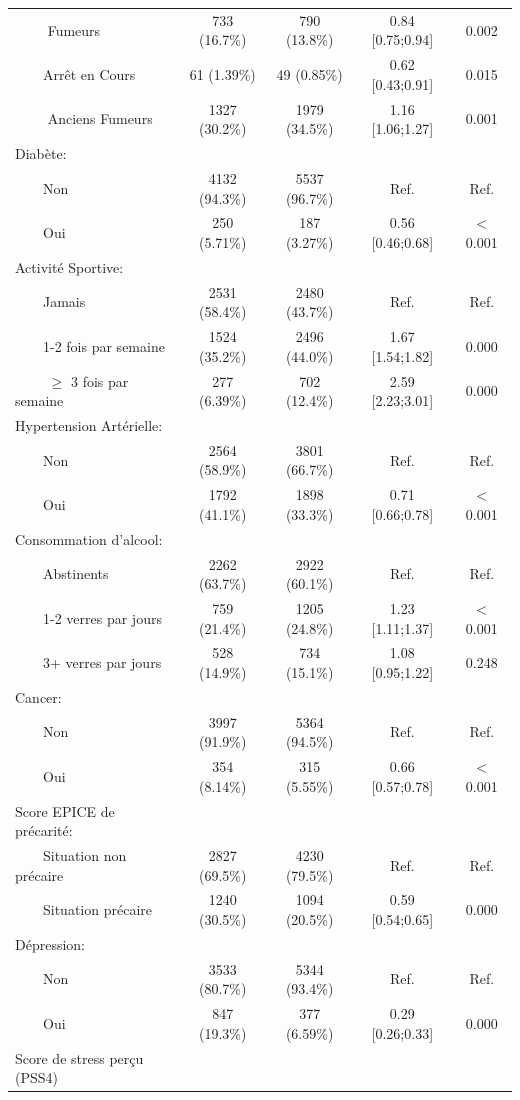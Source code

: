 \documentclass{book}
\begin{document}
\begin{longtable}{lcccc}
$\qquad$ Fumeurs & 733 (16.7\%)  & 790 (13.8\%)  & 0.84 [0.75;0.94] &  0.002 \\ 
$\qquad$Arrêt en Cours &  61 (1.39\%)  &  49 (0.85\%)  & 0.62 [0.43;0.91] &  0.015 \\ 
$\qquad$ Anciens Fumeurs & 1327 (30.2\%) & 1979 (34.5\%) & 1.16 [1.06;1.27] &  0.001 \\ 
Diabète: &              &              &                  &        \\ 
$\qquad$Non & 4132 (94.3\%) & 5537 (96.7\%) &       Ref.       &  Ref.  \\ 
$\qquad$Oui & 250 (5.71\%)  & 187 (3.27\%)  & 0.56 [0.46;0.68] & $<$0.001 \\ 
Activité Sportive: &              &              &                  &        \\ 
$\qquad$Jamais & 2531 (58.4\%) & 2480 (43.7\%) &       Ref.       &  Ref.  \\ 
$\qquad$1-2 fois par semaine & 1524 (35.2\%) & 2496 (44.0\%) & 1.67 [1.54;1.82] &  0.000 \\ 
$\qquad$ $\geq$ 3 fois par semaine & 277 (6.39\%)  & 702 (12.4\%)  & 2.59 [2.23;3.01] &  0.000 \\ 
Hypertension Artérielle: &              &              &                  &        \\ 
$\qquad$Non & 2564 (58.9\%) & 3801 (66.7\%) &       Ref.       &  Ref.  \\ 
$\qquad$Oui & 1792 (41.1\%) & 1898 (33.3\%) & 0.71 [0.66;0.78] & $<$0.001 \\ 
Consommation d'alcool: &              &              &                  &        \\ 
$\qquad$Abstinents & 2262 (63.7\%) & 2922 (60.1\%) &       Ref.       &  Ref.  \\ 
$\qquad$1-2  verres par jours& 759 (21.4\%)  & 1205 (24.8\%) & 1.23 [1.11;1.37] & $<$0.001 \\ 
$\qquad$3+ verres par jours & 528 (14.9\%)  & 734 (15.1\%)  & 1.08 [0.95;1.22] &  0.248 \\ 
Cancer: &              &              &                  &        \\ 
$\qquad$Non & 3997 (91.9\%) & 5364 (94.5\%) &       Ref.       &  Ref.  \\ 
$\qquad$Oui & 354 (8.14\%)  & 315 (5.55\%)  & 0.66 [0.57;0.78] & $<$0.001 \\ 
Score EPICE de précarité: &              &              &                  &        \\ 
$\qquad$Situation non précaire & 2827 (69.5\%) & 4230 (79.5\%) &       Ref.       &  Ref.  \\ 
$\qquad$Situation précaire & 1240 (30.5\%) & 1094 (20.5\%) & 0.59 [0.54;0.65] &  0.000 \\ 
Dépression: &              &              &                  &        \\ 
$\qquad$Non & 3533 (80.7\%) & 5344 (93.4\%) &       Ref.       &  Ref.  \\ 
$\qquad$Oui & 847 (19.3\%)  & 377 (6.59\%)  & 0.29 [0.26;0.33] &  0.000 \\ 
Score de stress perçu (PSS4)


\end{longtable}
\end{document}
